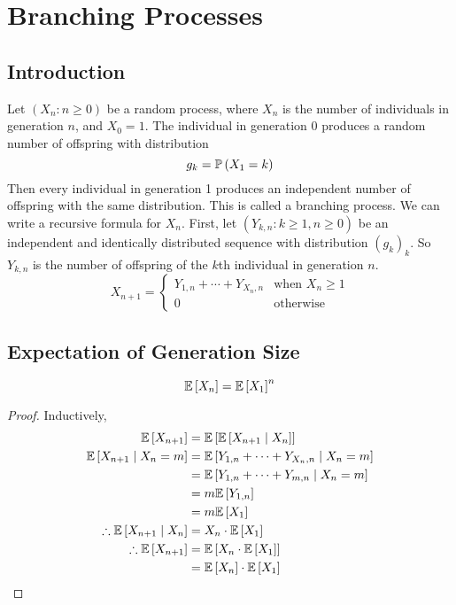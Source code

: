 \documentclass{article}
\begin{document}
\section{Branching Processes}
\subsection{Introduction}
Let $(X_n \colon n \geq 0)$ be a random process, where $X_n$ is the number of individuals in generation $n$, and $X_0 = 1$. The individual in generation 0 produces a random number of offspring with distribution
\[ g_k = \mathbb{P}\left({X_1 = k}\right) \]
Then every individual in generation 1 produces an independent number of offspring with the same distribution. This is called a branching process. We can write a recursive formula for $X_n$. First, let $(Y_{k, n} \colon k \geq 1, n \geq 0)$ be an independent and identically distributed sequence with distribution $(g_k)_k$. So $Y_{k, n}$ is the number of offspring of the $k$th individual in generation $n$.
\[ X_{n+1} = \begin{cases}
        Y_{1,n} + \cdots + Y_{X_n,n} & \text{when } X_n \geq 1 \\
        0                            & \text{otherwise}
    \end{cases} \]

\subsection{Expectation of Generation Size}
\begin{theorem}
    \[ \mathbb{E}\left[{X_n}\right] = \mathbb{E}\left[{X_1}\right]^n \]
\end{theorem}
\begin{proof}
    Inductively,
    \begin{align*}
        \mathbb{E}\left[{X_{n+1}}\right]                     & = \mathbb{E}\left[{\mathbb{E}\left[{X_{n+1} \mid X_n}\right]}\right]                 \\
        \mathbb{E}\left[{X_{n+1} \mid X_n = m}\right]        & = \mathbb{E}\left[{Y_{1,n} + \cdots + Y_{X_n,n} \mid X_n = m}\right] \\
                                             & = \mathbb{E}\left[{Y_{1,n} + \cdots + Y_{m,n} \mid X_n = m}\right]   \\
                                             & = m \mathbb{E}\left[{Y_{1,n}}\right]                                 \\
                                             & = m \mathbb{E}\left[{X_1}\right]                                     \\
        \therefore \mathbb{E}\left[{X_{n+1} \mid X_n}\right] & = X_n \cdot \mathbb{E}\left[{X_1}\right]                             \\
        \therefore \mathbb{E}\left[{X_{n+1}}\right]          & = \mathbb{E}\left[{X_n \cdot \mathbb{E}\left[{X_1}\right]}\right]                    \\
                                             & = \mathbb{E}\left[{X_n}\right] \cdot \mathbb{E}\left[{X_1}\right]
    \end{align*}
\end{proof}
\end{document}
